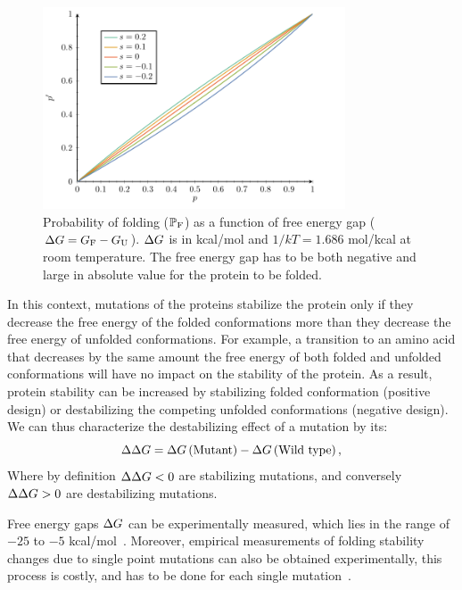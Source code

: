 \begin{figure}[H]
    \centering
    \includegraphics[width=0.8\textwidth, page=5] {figures.pdf}
    \caption[Probability of folding]{
    Probability of folding ($\mathbb{P}_{\textrm{F}}$) as a function of free energy gap ($\Delta G = G_{\textrm{F}} - G_{\textrm{U}}$).
    $\Delta G$ is in kcal/mol and $1/kT=1.686$ mol/kcal at room temperature.
    The free energy gap has to be both negative and large in absolute value for the protein to be folded.
    }
	\label{fig:intro-proba-folding}
\end{figure}

In this context, mutations of the proteins stabilize the protein only if they decrease the free energy of the folded conformations more than they decrease the free energy of unfolded conformations.
For example, a transition to an amino acid that decreases by the same amount the free energy of both folded and unfolded conformations will have no impact on the stability of the protein.
As a result, protein stability can be increased by stabilizing folded conformation (positive design) or destabilizing the competing unfolded conformations (negative design).
We can thus characterize the destabilizing effect of a mutation by its:
\begin{equation}
    \Delta \Delta G = \Delta G \left( \text{Mutant} \right) - \Delta G  \left( \text{Wild type} \right),
\end{equation}
Where by definition $\Delta \Delta G <0 $ are stabilizing mutations, and conversely $\Delta \Delta G > 0 $ are destabilizing mutations.

Free energy gaps $\Delta G$ can be experimentally measured, which lies in the range of $-25$ to $-5$ kcal/mol~\citep{Kumar2006, Gromiha2016}.
Moreover, empirical measurements of folding stability changes due to single point mutations can also be obtained experimentally, this process is costly, and has to be done for each single mutation~\citep{Rocklin2017}.

